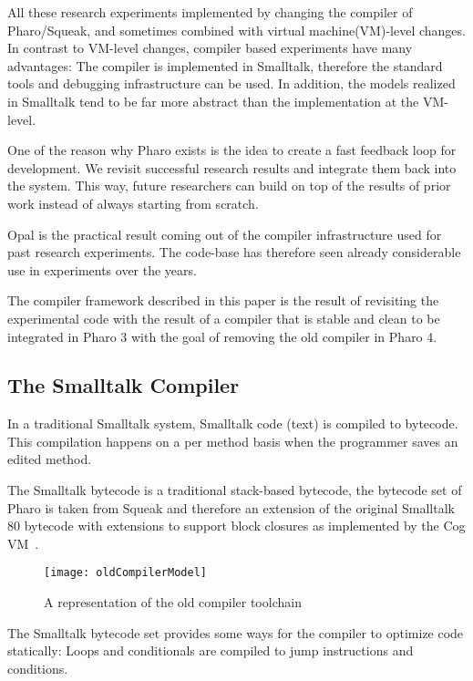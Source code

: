 \documentclass[preprint,10pt]{sigplanconf}
\begin{document}
All these research experiments implemented by changing the compiler of Pharo/Squeak, and sometimes combined with virtual machine(VM)-level changes.
In contrast to VM-level changes, compiler based experiments have many advantages: The compiler is implemented in Smalltalk, therefore the standard tools and debugging infrastructure can be used. In addition, the models realized in Smalltalk tend to be far more abstract than the implementation at the VM-level.

One of the reason why Pharo exists is the idea to create a fast feedback loop for development. We revisit successful research results and integrate them back into the system. 
This way, future researchers can build on top of the results of prior work instead of always starting from scratch. 

Opal is the practical result coming out of the compiler infrastructure used for past research experiments. The code-base has therefore  seen already considerable use in experiments over the years.  

The compiler framework described in this paper is the result of revisiting the experimental code with the result of a compiler that is stable and
clean to be integrated in Pharo 3 with the goal of removing the old compiler in Pharo 4.

\subsection{The Smalltalk Compiler}
In a traditional Smalltalk system, Smalltalk code (text) is compiled to bytecode. This compilation happens on a per method basis when the programmer saves an edited method.

The Smalltalk bytecode is a traditional stack-based bytecode, the bytecode set of Pharo is taken from Squeak and therefore an extension of the original Smalltalk
80 bytecode with extensions to support block closures as implemented by the Cog VM~\cite{Mira11a}.


\begin{figure}[ht]
\begin{center}
	\texttt{[image: oldCompilerModel]}
	\caption{A representation of the old compiler toolchain}
\end{center}
\end{figure}

The Smalltalk bytecode set provides some ways for the compiler to optimize code statically: Loops and conditionals are compiled to jump instructions and conditions.
\end{document}

